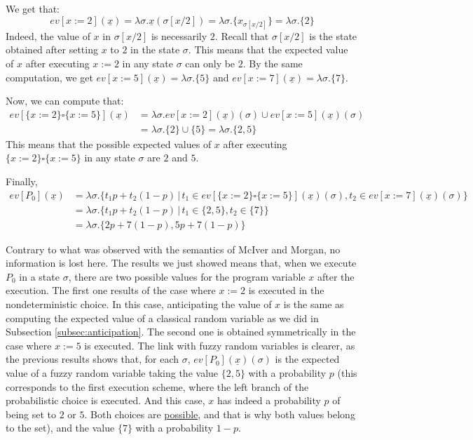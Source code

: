 \documentclass[a4paper,10pt]{llncs}
\begin{document}
We get that:
$$ev[x := 2](\underline{x}) = \lambda\sigma.\underline{x}(\sigma[x/2]) = \lambda\sigma.\{x_{\sigma[x/2]}\} = \lambda\sigma.\{2\}$$ 
Indeed, the value of $x$ in $\sigma[x/2]$ is necessarily $2$. Recall that $\sigma[x/2]$ is the state obtained after setting $x$ to $2$ in the state $\sigma$. This means that the expected value of $x$ after executing $x := 2$ in any state $\sigma$ can only be $2$. By the same computation, we get $ev[x := 5](\underline{x}) = \lambda\sigma.\{5\}$ and $ev[x := 7](\underline{x}) = \lambda\sigma.\{7\}$.\newline

Now, we can compute that:
\begin{align*}
ev[\{x := 2\} \square \{x := 5\}](\underline{x}) &= \lambda\sigma. ev[x := 2](\underline{x})(\sigma) \cup ev[x := 5](\underline{x})(\sigma) \\
&= \lambda\sigma. \{2\} \cup \{5\} = \lambda\sigma.\{2,5\} 
\end{align*}
This means that the possible expected values of $x$ after executing $\{x := 2\} \square \{x := 5\}$ in any state $\sigma$ are $2$ and $5$.\newline

Finally, 
\begin{align*}
ev[P_0](\underline{x}) &= \lambda\sigma.\{t_1 p+t_2(1-p) \,|\, t_1 \in ev[\{x := 2\} \square \{x := 5\}](\underline{x})(\sigma), t_2 \in ev[x := 7](\underline{x})(\sigma) \} \\
&= \lambda\sigma.\{t_1 p+t_2(1-p) \,|\, t_1 \in \{2,5\}, t_2 \in \{7\} \} \\
&= \lambda\sigma. \{2p+7(1-p),5p+7(1-p) \} 
\end{align*}

Contrary to what was observed with the semantics of McIver and Morgan, no information is lost here.
The results we just showed means that, when we execute $P_0$ in a state $\sigma$, there are two possible values for the program variable $x$ after the execution. The first one results of the case where $x := 2$ is executed in the nondeterministic choice. In this case, anticipating the value of $x$ is the same as computing the expected value of a classical random variable as we did in Subsection \ref{subsec:anticipation}. The second one is obtained symmetrically in the case where $x := 5$ is executed.\newline
The link with fuzzy random variables is clearer, as the previous results shows that, for each $\sigma$, $ev[P_0](\underline{x})(\sigma)$ is the expected value of a fuzzy random variable taking the value $\{2,5\}$ with a probability $p$ (this corresponds to the first execution scheme, where the left branch of the probabilistic choice is executed. And this case, $x$ has indeed a probability $p$ of being set to $2$ or $5$. Both choices are \underline{possible}, and that is why both values belong to the set), and the value $\{7\}$ with a probability $1-p$.
\bigskip
\end{document}
